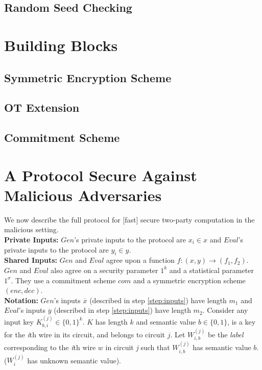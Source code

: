 \documentclass{article}
\begin{document}
\subsection{Random Seed Checking}

\section{Building Blocks}

\subsection{Symmetric Encryption Scheme}

\subsection{OT Extension}

\subsection{Commitment Scheme}


\section{A Protocol Secure Against Malicious Adversaries}

We now describe the full protocol for [fast] secure two-party computation in the malicious setting.\\

\textbf{Private Inputs: }
$Gen$'s private inputs to the protocol are $x_{i} \in x$ and $Eval$'s private inputs to the protocol are $y_{i} \in y$.\\
\textbf{Shared Inputs: }
$Gen$ and $Eval$ agree upon a function $f : (x,y) \rightarrow (f_{1},f_{2})$.  $Gen$ and $Eval$ also agree on a security parameter $1^{k}$ and a statistical parameter $1^{\sigma}$. They use a commitment scheme $com$ and a symmetric encryption scheme $(enc,dec)$. \\
\textbf{Notation: }
$Gen$'s inputs $\overline{x}$ (described in step \ref{step:inputs}) have length $m_1$ and $Eval$'s inputs $\overline{y}$ (described in step \ref{step:inputs}) have length $m_2$.  Consider any input key $K_{b,i}^{(j)} \in \{0,1\}^{k}$. $K$ has length $k$ and semantic value $b \in \{0,1\}$, is a key for the \emph{i}th wire in its circuit, and belongs to circuit $j$. Let $W_{i,b}^{(j)}$ be the \emph{label} corresponding to the \emph{i}th wire $w$ in circuit \emph{j} such that $W_{i,b}^{(j)}$ has semantic value $b$. ($W_{i}^{(j)}$ has unknown semantic value).
\end{document}
